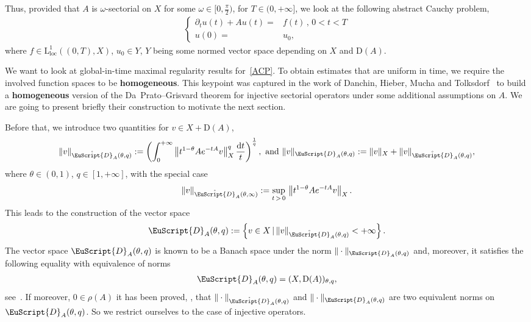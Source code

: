 \documentclass[AHL,Unicode,longabstracts,published]{cedram}
\newcommand{\rmd}{\mathrm{d}}
\newcommand{\rmD}{\mathrm{D}}
\newcommand{\rmL}{\mathrm{L}}
\newcommand{\locc}{\mathrm{loc}}
\newcommand{\rgeusD}{\mathring{\eus{D}}}
\newcommand{\eus}{\EuScript}
\begin{document}
Thus, provided that $A$ is $\omega$-sectorial on $X$ for some $\omega\in [0,\tfrac{\pi}{2})$, for $T\in(0,+\infty]$, we look at the following abstract Cauchy problem,
\begin{align}
\tag{ACP}\label{ACP}
\left\{
\begin{array}{rl}
\partial_t u(t) +Au(t) =& f(t) \,\text{, } 0<t<T\\
u(0) =& u_0\text{,}
\end{array}
\right.
\end{align}
where $f\in \rmL^1_{\locc}((0,T),X)$, $u_0 \in Y$, $Y$ being some normed vector space depending on $X$ and $\rmD(A)$.

We want to look at global-in-time maximal regularity results for~\eqref{ACP}. To obtain estimates that are uniform in time, we require the involved function spaces to be \textbf{homogeneous}. This keypoint was captured in the work of Danchin, Hieber, Mucha and Tolksdorf~\cite[Chapter~2]{DanchinHieberMuchaTolk2020} to build a \textbf{homogeneous} version of the Da~Prato--Grisvard theorem for injective sectorial operators under some additional assumptions on $A$. We are going to present briefly their construction to motivate the next section.

Before that, we introduce two quantities for $v\in X + \rmD(A)$,
\begin{align*}
\| v\|_{\rgeusD_{A}(\theta,q)}:= \left(\int_{0}^{+\infty} \left\| t^{1-\theta}Ae^{-tA} v \right\|_{X}^q \frac{\rmd t}{t}\right)^\frac{1}{q},\text{ and } \| v\|_{{\eus{D}}_{A}(\theta,q)}:= \| v \|_X + \| v\|_{\rgeusD_{A}(\theta,q)},
\end{align*}
where $\theta \in(0,1)$, $q\in[1,+\infty]$, with the special case
\begin{align*}
\| v\|_{\rgeusD_{A}(\theta,\infty)}:= \sup_{t\,>\,0}\,\left\| t^{1-\theta}Ae^{-tA} v\right\|_{X}.
\end{align*}
This leads to the construction of the vector space
\begin{align*}
{\eus{D}}_{A}(\theta,q):= \left\{ v\in X\,|\, \| v\|_{\rgeusD_{A}(\theta,q)}<+\infty \right\} .
\end{align*}
The vector space ${\eus{D}}_{A}(\theta,q)$ is known to be a Banach space under the norm $\| \cdot\|_{{\eus{D}}_{A}(\theta,q)}$ and, moreover, it satisfies the following equality with equivalence of norms
\begin{align}\label{eq:InterpolationXDomainAIntro}
{\eus{D}}_{A}(\theta,q) = (X,\rmD(A))_{\theta,q},
\end{align}
see~\cite[Theorem~6.2.9]{bookHaase2006}. If moreover, $0\in \rho(A)$ it has been proved, \cite[Corollary~6.5.5]{bookHaase2006}, that $\| \cdot\|_{\rgeusD_{A}(\theta,q)}$ and $\| \cdot\|_{{\eus{D}}_{A}(\theta,q)}$ are two equivalent norms on ${\eus{D}}_{A}(\theta,q)$. So we restrict ourselves to the case of injective operators.
\end{document}
